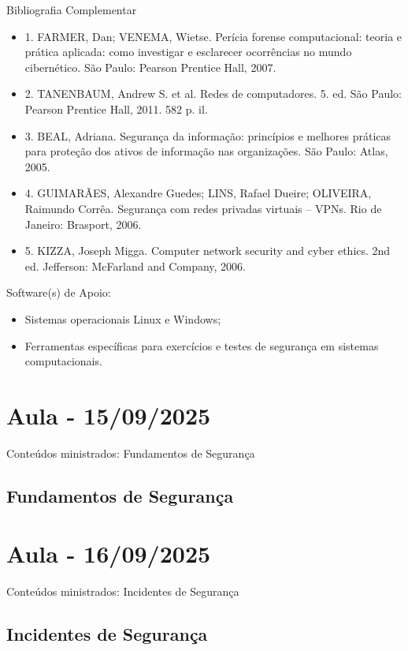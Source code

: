 \documentclass{article}
\begin{document}
\begin{center}
Bibliografia Complementar
\end{center}
\begin{itemize}
      \item 1. FARMER, Dan; VENEMA, Wietse. Perícia forense computacional: teoria e prática aplicada: como investigar e esclarecer ocorrências no mundo cibernético. São Paulo: Pearson Prentice Hall, 2007.
      \item 2. TANENBAUM, Andrew S. et al. Redes de computadores. 5. ed. São Paulo: Pearson Prentice Hall, 2011. 582 p. il.
      \item 3. BEAL, Adriana. Segurança da informação: princípios e melhores práticas para proteção dos ativos de informação nas organizações. São Paulo: Atlas, 2005.
      \item 4. GUIMARÃES, Alexandre Guedes; LINS, Rafael Dueire; OLIVEIRA, Raimundo Corrêa. Segurança com redes privadas virtuais – VPNs. Rio de Janeiro: Brasport, 2006.
      \item 5. KIZZA, Joseph Migga. Computer network security and cyber ethics. 2nd ed. Jefferson: McFarland and Company, 2006.      
\end{itemize}

\begin{center}
Software(s) de Apoio:
\end{center}
\begin{itemize}
      \item Sistemas operacionais Linux e Windows;
      \item Ferramentas específicas para exercícios e testes de segurança em sistemas computacionais.
\end{itemize}

\section{Aula - 15/09/2025}
Conteúdos ministrados: Fundamentos de Segurança
\subsection{Fundamentos de Segurança}

\section{Aula - 16/09/2025}
Conteúdos ministrados: Incidentes de Segurança
\subsection{Incidentes de Segurança}
\end{document}
